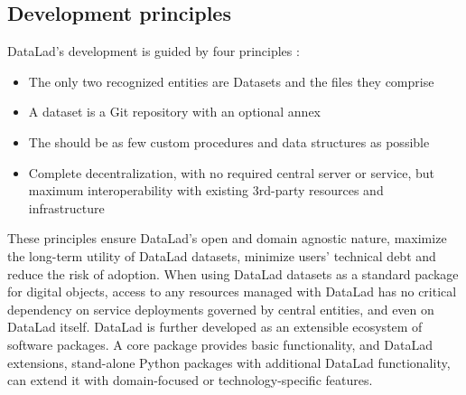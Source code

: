 {\subsection{Development principles}

DataLad's development is guided by four principles \citep{Halchenko2021}:
\begin{itemize}
	\item The only two recognized entities are Datasets and the files they comprise
	\item A dataset is a Git repository with an optional annex
	\item The should be as few custom procedures and data structures as possible
	\item Complete decentralization, with no required central server or service, but maximum interoperability with existing 3rd-party resources and infrastructure
\end{itemize}

These principles ensure DataLad's open and domain agnostic nature, maximize the long-term utility of DataLad datasets, minimize users’ technical debt and reduce the risk of adoption.
When using DataLad datasets as a standard package for digital objects, access to any resources managed with DataLad has no critical dependency on service deployments governed by central entities, and even on DataLad itself.
DataLad is further developed as an extensible ecosystem of software packages.
A core package provides basic functionality, and DataLad extensions, stand-alone Python packages with additional DataLad functionality, can extend it with domain-focused or technology-specific features.




}
